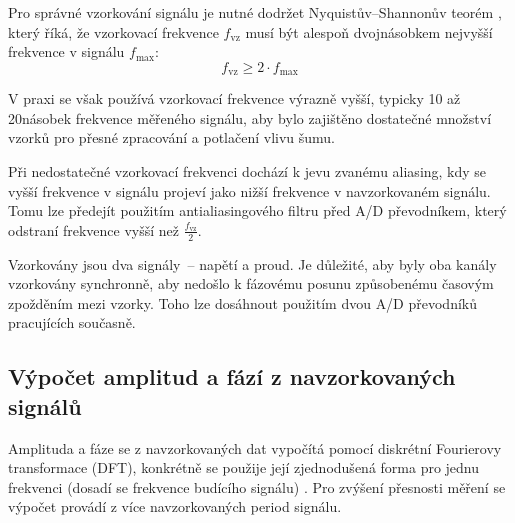 Pro správné vzorkování signálu je nutné dodržet Nyquistův--Shannonův teorém \cite[str.~11]{Shannon1949}, který říká, že vzorkovací frekvence $f_{\text{vz}}$ musí být alespoň dvojnásobkem nejvyšší frekvence v signálu $f_{\text{max}}$:
\begin{equation}
    f_{\text{vz}} \geq 2 \cdot f_{\text{max}}
    \label{eq:nyquist}
\end{equation}

V praxi se však používá vzorkovací frekvence výrazně vyšší, typicky 10 až 20násobek frekvence měřeného signálu, aby bylo zajištěno dostatečné množství vzorků
pro přesné zpracování a potlačení vlivu šumu.

Při nedostatečné vzorkovací frekvenci dochází k jevu zvanému aliasing, kdy se vyšší frekvence v signálu projeví jako nižší frekvence v navzorkovaném signálu. 
Tomu lze předejít použitím antialiasingového filtru před \acs{A/D} převodníkem, který odstraní frekvence vyšší než $\frac{f_{\text{vz}}}{2}$.

Vzorkovány jsou dva signály~-- napětí a proud. Je důležité, aby byly oba kanály vzorkovány synchronně, 
aby nedošlo k fázovému posunu způsobenému časovým zpožděním mezi vzorky. Toho lze dosáhnout použitím dvou \acs{A/D} převodníků pracujících současně.

\subsection{Výpočet amplitud a fází z navzorkovaných signálů}


Amplituda a fáze se z navzorkovaných dat vypočítá pomocí diskrétní Fourierovy transformace (\acs{DFT}), 
konkrétně se použije její zjednodušená forma pro jednu frekvenci (dosadí se frekvence budícího signálu) \cite[kap.~8]{smith_dsp_guide}.
Pro zvýšení přesnosti měření se výpočet provádí z více navzorkovaných period signálu.

